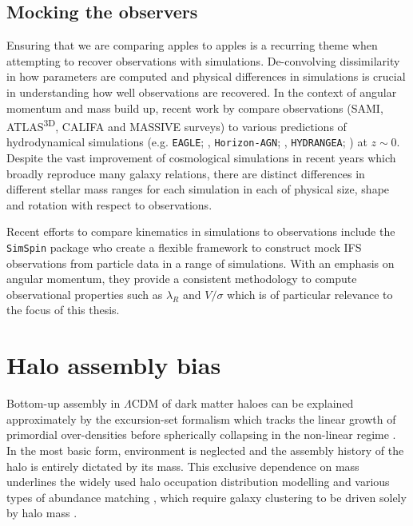 \subsection{Mocking the observers}
Ensuring that we are comparing apples to apples is a recurring theme when attempting to recover observations with simulations. De-convolving dissimilarity in how parameters are computed and physical differences in simulations is crucial in understanding how well observations are recovered. In the context of angular momentum and mass build up, recent work by \citet{sande2019} compare observations (SAMI, ATLAS\textsuperscript{3D}, CALIFA and MASSIVE surveys) to various predictions of hydrodynamical simulations (e.g. \texttt{EAGLE}; \citet{schaye2015}, \texttt{Horizon-AGN}; \citet{dubois2014}, \texttt{HYDRANGEA}; \citet{bahe2017}) at $z \sim 0$. Despite the vast improvement of cosmological simulations in recent years which broadly reproduce many galaxy relations, there are distinct differences in different stellar mass ranges for each simulation in each of physical size, shape and rotation with respect to observations.

Recent efforts to compare kinematics in simulations to observations include the \texttt{SimSpin} package \citep{harborne2019, harborne2020} who create a flexible framework to construct mock IFS observations from particle data in a range of simulations. With an emphasis on angular momentum, they provide a consistent methodology to compute observational properties such as $\lambda_R$ and $V/\sigma$ which is of particular relevance to the focus of this thesis.

\section{Halo assembly bias}
Bottom-up assembly in $\Lambda$CDM of dark matter haloes can be explained approximately by the excursion-set formalism which tracks the linear growth of primordial over-densities before spherically collapsing in the non-linear regime \citep{press1974,bond1991}. In the most basic form, environment is neglected and the assembly history of the halo is entirely dictated by its mass. This exclusive dependence on mass underlines the widely used halo occupation distribution \citep[HOD; e.g.][]{jing1998,peacock2000} modelling and various types of abundance matching \citep[e.g.][]{kravtsov2004,conroy2006}, which require galaxy clustering to be driven solely by halo mass \citep[e.g.][]{mo1996,sheth1999}. 

